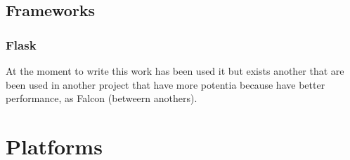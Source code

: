 \subsection{Frameworks}

\subsubsection{Flask}

At the moment to write this work has been used it but exists another
that are been used in another project that have more potentia because have
better performance, as Falcon (betweern anothers).


\section{Platforms}

